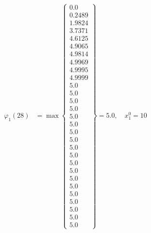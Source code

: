 \documentclass{article}
\begin{document}
\begin{align*}
  
  
  
\varphi_{1}(28) &= \max \left\{ \begin{array}{c}
0.0 \\
 0.2489 \\
 1.9824 \\
 3.7371 \\
 4.6125 \\
 4.9065 \\
 4.9814 \\
 4.9969 \\
 4.9995 \\
 4.9999 \\
 5.0 \\
 5.0 \\
 5.0 \\
 5.0 \\
 5.0 \\
 5.0 \\
 5.0 \\
 5.0 \\
 5.0 \\
 5.0 \\
 5.0 \\
 5.0 \\
 5.0 \\
 5.0 \\
 5.0 \\
 5.0 \\
 5.0 \\
 5.0 \\
 5.0
\end{array} \right\}=5.0,\quad x_{1}^0=10\\
  
  
  

\end{align*}
\end{document}
